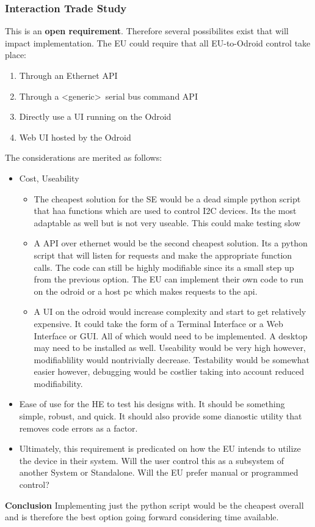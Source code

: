 \documentclass[11pt,letterpaper]{article}
\begin{document}
\subsubsection{Interaction Trade Study}
\label{sec:undefined_ui_req}
This is an {\color{red} \textbf{open requirement}}. Therefore several possibilites exist that will impact implementation.
The EU could require that all EU-to-Odroid control take place:
\begin{enumerate}
	\item Through an Ethernet API
	\item Through a \textless generic\textgreater \ serial bus command API
	\item Directly use a UI running on the Odroid
	\item Web UI hosted by the Odroid
\end{enumerate}

The considerations are merited as follows:
\begin{itemize}
	\item Cost, Useability
	      \begin{itemize}

		      \item The cheapest solution for the SE would be a dead simple python script that haa functions which
		            are used to control I2C devices. Its the most adaptable as well but is not very useable. This could
		            make testing slow
		      \item A API over ethernet would be the second cheapest solution. Its a python script that will listen for
		            requests and make the appropriate function calls. The code can still be highly modifiable since its a small step
		            up from the previous option. The EU can implement their own code to run on the odroid or a host pc which makes requests to the api.
		      \item A UI on the odroid would increase complexity and start to get relatively expensive. It could take the form of a
		            Terminal Interface or a Web Interface or GUI. All of which would need to be implemented.
		            A desktop may need to be installed as well. Useability would be very high however, modifiablility would nontrivially decrease. Testability
		            would be somewhat easier however, debugging would be costlier taking into account reduced modifiability.

	      \end{itemize}
	\item Ease of use for the HE to test his designs with. It should be something simple, robust, and quick. It should also provide some
	      dianostic utility that removes code errors as a factor.

	\item Ultimately, this requirement is predicated on how the EU intends to utilize the device in their system. Will the user control this as
	      a subsystem of another System or Standalone. Will the EU prefer manual or programmed control?
\end{itemize}
\textbf{Conclusion} Implementing just the python script would be the cheapest overall and is therefore the best option going forward considering time available.
\end{document}
